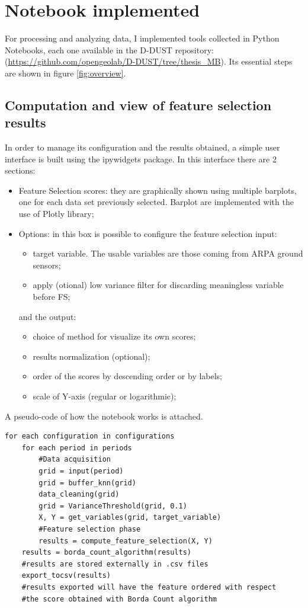 \section{Notebook implemented}
For processing and analyzing data, I implemented tools collected in Python Notebooks, each one available in the D-DUST repository:
(\url{https://github.com/opengeolab/D-DUST/tree/thesis_MB}).\newline
Its essential steps are shown in figure \ref{fig:overview}.

\subsection{Computation and view of feature selection results}
In order to manage its configuration and the results obtained, a simple user interface is built using the ipywidgets package.
In this interface there are 2 sections:
\begin{itemize}
\item Feature Selection scores: they are graphically shown using multiple barplots, one for each data set previously selected. Barplot are implemented with the use of Plotly library; 
\item Options: in this box is possible to configure the feature selection input:
\begin{itemize}
\item target variable. The usable variables are those coming from ARPA ground sensors;
\item apply (otional) low variance filter for discarding meaningless variable before FS;
\end{itemize}
and the output:
\begin{itemize}
\item choice of method for visualize its own scores;
\item results normalization (optional);
\item order of the scores by descending order or by labels;
\item scale of Y-axis (regular or logarithmic);
\end{itemize}
\end{itemize}
A pseudo-code of how the notebook works is attached.
\begin{verbatim}
for each configuration in configurations
    for each period in periods
        #Data acquisition
        grid = input(period)
        grid = buffer_knn(grid)
        data_cleaning(grid)
        grid = VarianceThreshold(grid, 0.1)
        X, Y = get_variables(grid, target_variable)
        #Feature selection phase
        results = compute_feature_selection(X, Y)
    results = borda_count_algorithm(results)
    #results are stored externally in .csv files
    export_tocsv(results) 
    #results exported will have the feature ordered with respect
    #the score obtained with Borda Count algorithm
\end{verbatim}
